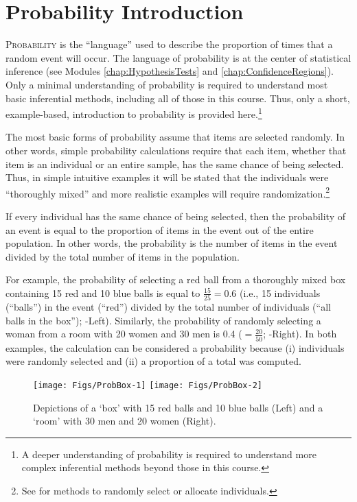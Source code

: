 \documentclass[10pt,openany]{book}\usepackage[]{graphicx}\usepackage[]{color}
\newenvironment{knitrout}{}{} %
\begin{document}
\chapter{Probability Introduction} \label{chap:ProbIntro}

\lettrine{P}{robability} is the ``language'' used to describe the proportion of times that a random event will occur. The language of probability is at the center of statistical inference (see Modules \ref{chap:HypothesisTests} and \ref{chap:ConfidenceRegions}). Only a minimal understanding of probability is required to understand most basic inferential methods, including all of those in this course. Thus, only a short, example-based, introduction to probability is provided here.\footnote{A deeper understanding of probability is required to understand more complex inferential methods beyond those in this course.}

The most basic forms of probability assume that items are selected randomly. In other words, simple probability calculations require that each item, whether that item is an individual or an entire sample, has the same chance of being selected. Thus, in simple intuitive examples it will be stated that the individuals were ``thoroughly mixed'' and more realistic examples will require randomization.\footnote{See  for methods to randomly select or allocate individuals.}

If every individual has the same chance of being selected, then the probability of an event is equal to the proportion of items in the event out of the entire population. In other words, the probability is the number of items in the event divided by the total number of items in the population.

For example, the probability of selecting a red ball from a thoroughly mixed box containing 15 red and 10 blue balls is equal to $\frac{15}{25}=0.6$ (i.e., 15 individuals (``balls'') in the event (``red'') divided by the total number of individuals (``all balls in the box''); -Left). Similarly, the probability of randomly selecting a woman from a room with 20 women and 30 men is 0.4 ($=\frac{20}{50}$; -Right). In both examples, the calculation can be considered a probability because (i) individuals were randomly selected and (ii) a proportion of a total was computed.

\begin{knitrout}
\color{fgcolor}\begin{figure}[hbtp]

{\centering \texttt{[image: Figs/ProbBox-1]} 
\texttt{[image: Figs/ProbBox-2]} 

}

\caption[Depictions of a `box' with 15 red balls and 10 blue balls (Left) and a `room' with 30 men and 20 women (Right)]{Depictions of a `box' with 15 red balls and 10 blue balls (Left) and a `room' with 30 men and 20 women (Right).}\label{fig:ProbBox}
\end{figure}


\end{knitrout}
\end{document}
